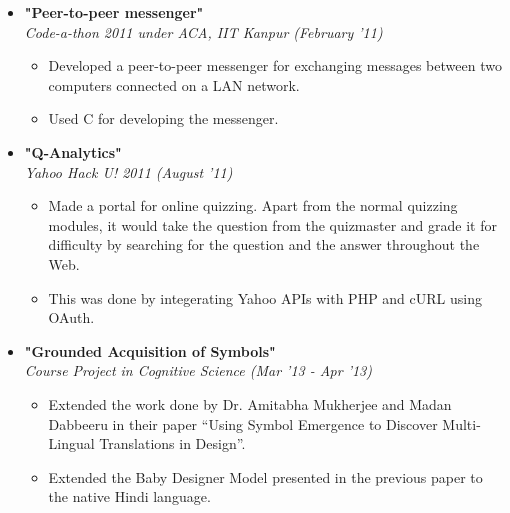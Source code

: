 \documentclass[margin,line]{resume}
\begin{document}
\begin{resume}
\begin{itemize}
  \item \large{\textbf{\textsf{"Peer-to-peer messenger"}}}
    \\ \small{\textit{Code-a-thon 2011 under ACA, IIT Kanpur (February '11)}}
    \normalsize
    \begin{itemize}
    \item Developed a peer-to-peer messenger for exchanging messages between two computers connected on a LAN network.
    \item Used C for developing the messenger.
    \end{itemize}

  \item \large{\textbf{\textsf{"Q-Analytics"}}}
    \\ \small{\textit{Yahoo Hack U! 2011 (August '11)}}
    \normalsize
    \begin{itemize}
    \item Made a portal for online quizzing. Apart from the normal quizzing modules, it would take the question from the quizmaster and grade it for difficulty by searching for the question and the answer throughout the Web.
    \item This was done by integerating Yahoo APIs with PHP and cURL using OAuth.
    \end{itemize}

  \item \large{\textbf{\textsf{"Grounded Acquisition of Symbols"}}}
    \\ \small{\textit{Course Project in Cognitive Science (Mar '13 - Apr '13)}}
    \normalsize
    \begin{itemize}
    \item Extended the work done by Dr. Amitabha Mukherjee and Madan Dabbeeru in their paper ``Using Symbol Emergence to Discover Multi-Lingual Translations in Design''.
    \item Extended the Baby Designer Model presented in the previous paper to the native Hindi language.
    \end{itemize}


\end{itemize}
\end{resume}
\end{document}
